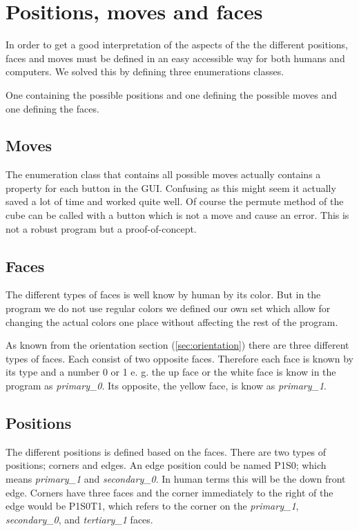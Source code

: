 \section{Positions, moves and faces}
In order to get a good interpretation of the aspects of the \cube{} the different positions, faces and moves must be defined in an easy accessible way for both humans and computers. We solved this by defining three enumerations classes. 

One containing the possible positions and one defining the possible moves and one defining the faces.

\subsection{Moves}
The enumeration class that contains all possible moves actually contains a property for each button in the GUI. Confusing as this might seem it actually saved a lot of time and worked quite well. Of course the permute method of the cube can be called with a button which is not a move and cause an error. This is not a robust program but a proof-of-concept. 

\subsection{Faces}
The different types of faces is well know by human by its color.
But in the program we do not use regular colors we defined our own set which allow for changing the actual colors one place without affecting the rest of the program. 

As known from the orientation section (\ref{sec:orientation}) there are three different types of faces.
Each consist of two opposite faces. Therefore each face is known by its type and a number 0 or 1 e. g. the up face or the white face is know in the program as \textit{primary\_0}.
Its opposite, the yellow face, is know as \textit{primary\_1}. 

\subsection{Positions}
The different positions is defined based on the faces. There are two types of positions; corners and edges.
An edge position could be named P1S0; which means \textit{primary\_1} and \textit{secondary\_0}.
In human terms this will be the down front edge.
Corners have three faces and the corner immediately to the right of the edge would be P1S0T1, which refers to the corner on the \textit{primary\_1}, \textit{secondary\_0}, and \textit{tertiary\_1} faces.

